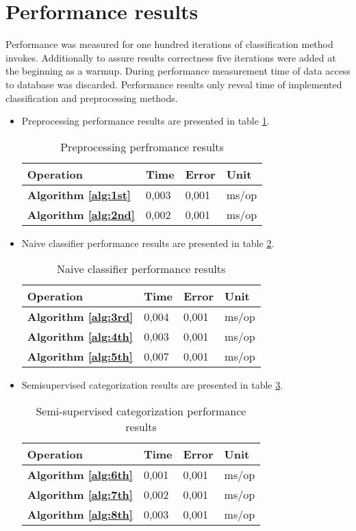 \section{Performance results}
Performance was measured for one hundred iterations of classification method invokes. Additionally to assure results correctness five iterations were added at the beginning as a warmup. During performance measurement time of data access to database was discarded. Performance results only reveal time of implemented classification and preprocessing methods.
\begin{itemize}
	\item Preprocessing performance results are presented in table \ref{tabPreprocessing}. 
	\begin{table}
	\begin{tabular}{ | l | l | l | l |}
		\hline
		Operation & Time & Error & Unit\\ \hline		
		\textbf{Algorithm \ref{alg:1st}} & 0,003 & 0,001 & ms/op \\
		\textbf{Algorithm \ref{alg:2nd}} & 0,002 & 0,001 & ms/op \\		
		\hline
	\end{tabular}
	\label{tabPreprocessing}
	\caption{Preprocessing perfromance results}
	\end{table}
	\item Naive classifier performance results are presented in table \ref{tabNaive}.
	\begin{table}
	\begin{tabular}{ | l | l | l | l |}
		\hline
		Operation & Time & Error & Unit\\ \hline		
		\textbf{Algorithm \ref{alg:3rd}} & 0,004 &  0,001 & ms/op \\
		\textbf{Algorithm \ref{alg:4th}} & 0,003 &  0,001 & ms/op \\
		\textbf{Algorithm \ref{alg:5th}} & 0,007 &  0,001 & ms/op \\
		\hline
	\end{tabular}
	\label{tabNaive}
	\caption{Naive classifier performance results}
\end{table}
	\item Semisupervised categorization results are presented in table \ref{tabSemi}.
		\begin{table}
			\begin{tabular}{ | l | l | l | l |}
				\hline
				Operation & Time & Error & Unit\\ \hline		
				\textbf{Algorithm \ref{alg:6th}} & 0,001 &  0,001 & ms/op \\
				\textbf{Algorithm \ref{alg:7th}} & 0,002 &  0,001 & ms/op \\
				\textbf{Algorithm \ref{alg:8th}} & 0,003 &  0,001 & ms/op \\
					\hline
				\end{tabular}
				\label{tabSemi}
				\caption{Semi-supervised categorization performance results}
			\end{table}
\end{itemize}
